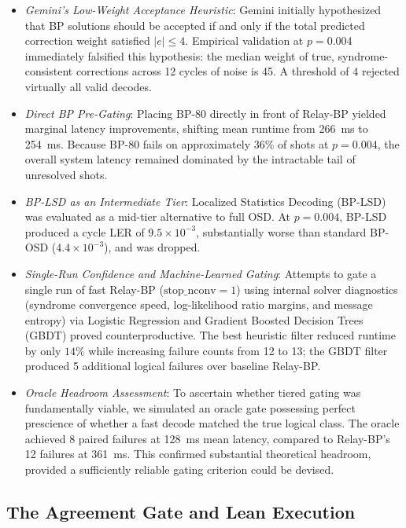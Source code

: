 \begin{itemize}
    \item \textit{Gemini's Low-Weight Acceptance Heuristic}: Gemini initially hypothesized that BP solutions should be accepted if and only if the total predicted correction weight satisfied $|e| \le 4$. Empirical validation at $p = 0.004$ immediately falsified this hypothesis: the median weight of true, syndrome-consistent corrections across 12 cycles of noise is 45. A threshold of 4 rejected virtually all valid decodes.
    \item \textit{Direct BP Pre-Gating}: Placing BP-80 directly in front of Relay-BP yielded marginal latency improvements, shifting mean runtime from 266~ms to 254~ms. Because BP-80 fails on approximately $36\%$ of shots at $p = 0.004$, the overall system latency remained dominated by the intractable tail of unresolved shots.
    \item \textit{BP-LSD as an Intermediate Tier}: Localized Statistics Decoding (BP-LSD) was evaluated as a mid-tier alternative to full OSD. At $p = 0.004$, BP-LSD produced a cycle LER of $9.5 \times 10^{-3}$, substantially worse than standard BP-OSD ($4.4 \times 10^{-3}$), and was dropped.
    \item \textit{Single-Run Confidence and Machine-Learned Gating}: Attempts to gate a single run of fast Relay-BP ($\text{stop\_nconv}=1$) using internal solver diagnostics (syndrome convergence speed, log-likelihood ratio margins, and message entropy) via Logistic Regression and Gradient Boosted Decision Trees (GBDT) proved counterproductive. The best heuristic filter reduced runtime by only $14\%$ while increasing failure counts from 12 to 13; the GBDT filter produced 5 additional logical failures over baseline Relay-BP.
    \item \textit{Oracle Headroom Assessment}: To ascertain whether tiered gating was fundamentally viable, we simulated an oracle gate possessing perfect prescience of whether a fast decode matched the true logical class. The oracle achieved 8 paired failures at 128~ms mean latency, compared to Relay-BP's 12 failures at 361~ms. This confirmed substantial theoretical headroom, provided a sufficiently reliable gating criterion could be devised.
\end{itemize}

\subsection{The Agreement Gate and Lean Execution}

